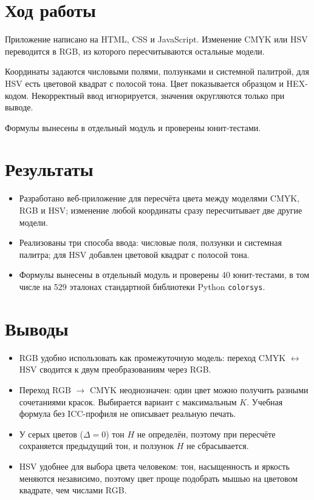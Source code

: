 \documentclass[11pt,a4paper]{article}
\begin{document}
\section{Ход работы}
Приложение написано на HTML, CSS и JavaScript. Изменение CMYK или HSV
переводится в RGB, из которого пересчитываются остальные модели.

Координаты задаются числовыми полями, ползунками и системной палитрой, для HSV
есть цветовой квадрат с полосой тона. Цвет показывается образцом и HEX-кодом.
Некорректный ввод игнорируется, значения округляются только при выводе.

Формулы вынесены в отдельный модуль и проверены юнит-тестами.

\section{Результаты}
\begin{itemize}[label=--, leftmargin=1.5em, itemsep=0.2em, topsep=0.2em]
  \item Разработано веб-приложение для пересчёта цвета между моделями CMYK,
        RGB и HSV; изменение любой координаты сразу пересчитывает две другие модели.
  \item Реализованы три способа ввода: числовые поля, ползунки и системная
        палитра; для HSV добавлен цветовой квадрат с полосой тона.
  \item Формулы вынесены в отдельный модуль и проверены 40 юнит-тестами, в том
        числе на 529 эталонах стандартной библиотеки Python \texttt{colorsys}.
\end{itemize}

\section{Выводы}
\begin{itemize}[label=--, leftmargin=1.5em, itemsep=0.2em, topsep=0.2em]
  \item RGB удобно использовать как промежуточную модель: переход
        CMYK $\leftrightarrow$ HSV сводится к двум преобразованиям через RGB.
  \item Переход RGB $\to$ CMYK неоднозначен: один цвет можно получить разными
        сочетаниями красок. Выбирается вариант с максимальным $K$. Учебная
        формула без ICC-профиля не описывает реальную печать.
  \item У серых цветов ($\Delta = 0$) тон $H$ не определён, поэтому при
        пересчёте сохраняется предыдущий тон, и ползунок $H$ не сбрасывается.
  \item HSV удобнее для выбора цвета человеком: тон, насыщенность и яркость
        меняются независимо, поэтому цвет проще подобрать мышью на цветовом
        квадрате, чем числами RGB.
\end{itemize}
\end{document}
